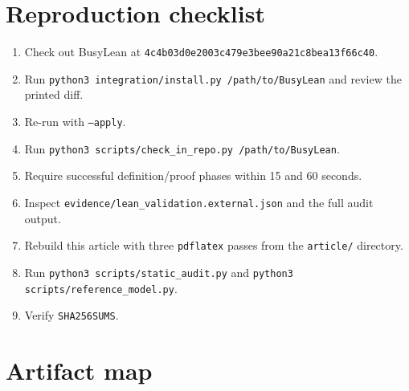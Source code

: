 \documentclass[11pt]{article}
\theoremstyle{definition}
\theoremstyle{remark}
\newcommand{\code}[1]{\texttt{#1}}
\newcommand{\pin}{\texttt{4c4b03d0e2003c479e3bee90a21c8bea13f66c40}}
\begin{document}


\section{Reproduction checklist}

\begin{enumerate}
\item Check out BusyLean at \pin.
\item Run \code{python3 integration/install.py /path/to/BusyLean} and review the
printed diff.
\item Re-run with \code{--apply}.
\item Run \code{python3 scripts/check\_in\_repo.py /path/to/BusyLean}.
\item Require successful definition/proof phases within 15 and 60 seconds.
\item Inspect \code{evidence/lean\_validation.external.json} and the full audit
output.
\item Rebuild this article with three \code{pdflatex} passes from the
\code{article/} directory.
\item Run \code{python3 scripts/static\_audit.py} and
\code{python3 scripts/reference\_model.py}.
\item Verify \code{SHA256SUMS}.
\end{enumerate}

\section{Artifact map}
\end{document}
